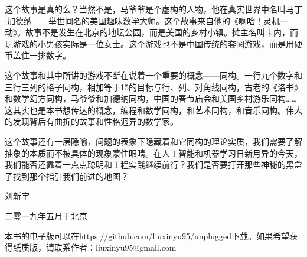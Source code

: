 \documentclass[UTF8]{article}
\begin{document}
这个故事是真的么？当然不是，马爷爷是个虚构的人物，他在真实世界中名叫马丁$\cdot$加德纳——举世闻名的美国趣味数学大师。这个故事来自他的《啊哈！灵机一动》。故事不是发生在北京的地坛公园，而是美国的乡村小镇。摊主名叫卡内，而玩游戏的小男孩实际是一位女士。这个游戏也不是中国传统的套圈游戏，而是用硬币盖住一排数字。

这个故事和其中所讲的游戏不断在说着一个重要的概念——同构。一行九个数字和三行三列的格子同构，相加等于15的目标与行、列、对角线同构，古老的《洛书》和数学幻方同构，马爷爷和加德纳同构，中国的春节庙会和美国乡村游乐同构……这其实也是本书想传达的概念，编程和数学同构，和艺术同构，和音乐同构。伟大的发现背后有曲折的故事和性格迥异的数学家。

这个故事还有一层隐喻，问题的表象下隐藏着和它同构的理论实质，我们需要了解抽象的本质而不被具体的现象蒙住眼睛。在人工智能和机器学习日新月异的今天，我们能否还靠着一点点聪明和工程实践继续前行？我们是否要打开那些神秘的黑盒子找到那个指引我们前进的地图？

\vspace{15mm}

刘新宇

二零一九年五月于北京

\begin{Exercise}
\end{Exercise}

\vspace{10mm}

本书的电子版可以在\url{https://github.com/liuxinyu95/unplugged}下载。如果希望获得纸质版，请联系作者：liuxinyu95@gmail.com

\ifx\wholebook\relax \else

\expandafter\enddocument

\fi
\end{document}
